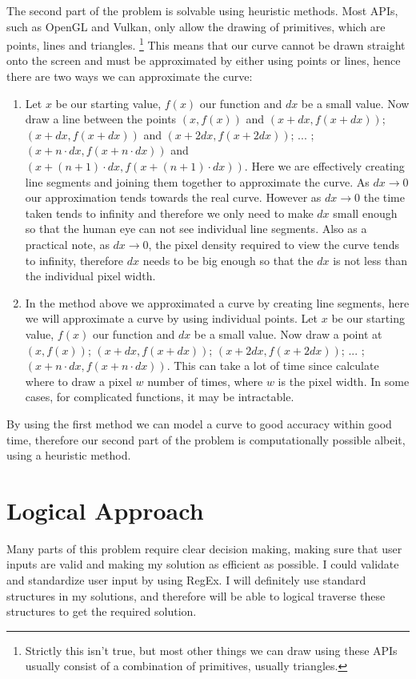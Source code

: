 \documentclass[../../../main.tex]{subfiles}
\begin{document}
The second part of the problem is solvable using heuristic methods. Most APIs, such as OpenGL\cite{opengl} and Vulkan, only allow the drawing of primitives, which are points, lines and triangles.
\footnote{Strictly this isn't true, but most other things we can draw using these APIs usually consist of a combination of primitives, usually triangles.} This means that our curve cannot be drawn straight onto the screen and must be approximated by either using points or lines, hence there are two ways we can approximate the curve:
\begin{enumerate}
\item Let $x$ be our starting value, $f(x)$ our function and $dx$ be a small value. Now draw a line between the points $(x,f(x))$ and $(x+dx,f(x+dx))$; $(x+dx,f(x+dx))$ and $(x+2dx,f(x+2dx))$; ... ;$(x+n\cdot dx,f(x+n\cdot dx))$ and $(x+(n+1)\cdot dx,f(x+(n+1)\cdot dx))$. Here we are effectively creating line segments and joining them together to approximate the curve. As $dx\to0$ our approximation tends towards the real curve. However as $dx\to0$ the time taken tends to infinity and therefore we only need to make $dx$ small enough so that the human eye can not see individual line segments. Also as a practical note, as $dx\to0$, the pixel density required to view the curve tends to infinity, therefore $dx$ needs to be big enough so that the $dx$ is not less than the individual pixel width.
\item In the method above we approximated a curve by creating line segments, here we will approximate a curve by using individual points. Let $x$ be our starting value, $f(x)$ our function and $dx$ be a small value. Now draw a point at $(x,f(x))$; $(x+dx,f(x+dx))$; $(x+2dx,f(x+2dx))$; ... ;$(x+n\cdot dx,f(x+n\cdot dx))$. This can take a lot of time since calculate where to draw a pixel $w$ number of times, where $w$ is the pixel width. In some cases, for complicated functions, it may be intractable.
\end{enumerate}
By using the first method we can model a curve to good accuracy within good time, therefore our second part of the problem is computationally possible albeit, using a heuristic method.
\newpage
\section{Logical Approach}
Many parts of this problem require clear decision making, making sure that user inputs are valid and making my solution as efficient as possible. I could validate and standardize user input by using RegEx\cite{regex}. I will definitely use standard structures in my solutions, and therefore will be able to logical traverse these structures to get the required solution.
\end{document}
